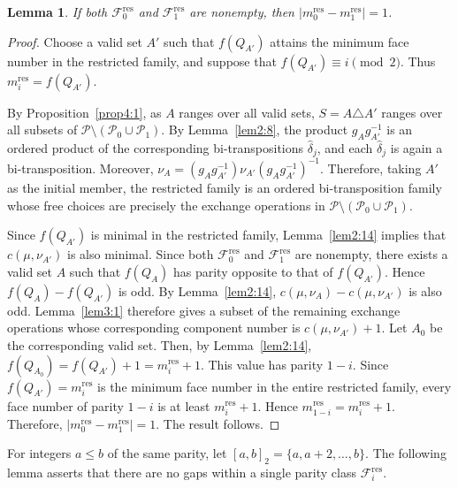 \documentclass[10pt,a4paper]{amsart}
\newtheorem{lemma}[theorem]{Lemma}
\newcommand{\intervaltwo}[2]{[#1,#2]_2}
\begin{document}
\begin{lemma}
\label{lem4:1}
If both $\mathcal F_0^{\mathrm{res}}$ and
$\mathcal F_1^{\mathrm{res}}$ are nonempty, then
$\bigl|m_0^{\mathrm{res}}-m_1^{\mathrm{res}}\bigr|=1$.
\end{lemma}
 \begin{proof}
Choose a valid set $A'$ such that $f(Q_{A'})$ attains the minimum
face number in the restricted family, and suppose that
$f(Q_{A'})\equiv i\pmod 2$. Thus
$m_i^{\mathrm{res}}=f(Q_{A'})$.


By Proposition~\ref{prop4:1}, as $A$ ranges over all valid sets,
$S=A\triangle A'$ ranges over all subsets of
$\mathcal P\setminus(\mathcal P_0\cup\mathcal P_1)$.
By Lemma~\ref{lem2:8}, the product
$g_Ag_{A'}^{-1}$ is an ordered product of the corresponding
bi-transpositions $\widehat\delta_j$, and each
$\widehat\delta_j$ is again a bi-transposition. Moreover,
$\nu_A=(g_Ag_{A'}^{-1})\nu_{A'}(g_Ag_{A'}^{-1})^{-1}$.
Therefore, taking $A'$ as the initial member,
the restricted family is an ordered bi-transposition family
whose free choices are precisely the
exchange operations in
$\mathcal P\setminus(\mathcal P_0\cup\mathcal P_1)$.

Since $f(Q_{A'})$ is minimal in the restricted family,
Lemma~\ref{lem2:14} implies that
$c(\mu,\nu_{A'})$ is also minimal. Since both
$\mathcal F_0^{\mathrm{res}}$ and
$\mathcal F_1^{\mathrm{res}}$ are nonempty, there exists a valid set
$A$ such that $f(Q_A)$ has parity opposite to that of $f(Q_{A'})$.
Hence $f(Q_A)-f(Q_{A'})$ is odd. By Lemma~\ref{lem2:14},
$c(\mu,\nu_A)-c(\mu,\nu_{A'})$ is also odd.
Lemma~\ref{lem3:1} therefore gives a subset of the remaining exchange
operations whose corresponding component number is
$c(\mu,\nu_{A'})+1$. Let $A_0$ be the corresponding valid set.
Then, by Lemma~\ref{lem2:14},
$f(Q_{A_0})=f(Q_{A'})+1=m_i^{\mathrm{res}}+1$.
This value has parity $1-i$.
Since
$f(Q_{A'})=m_i^{\mathrm{res}}$
is the minimum face number in the entire restricted family, every face
number of parity $1-i$ is at least
$m_i^{\mathrm{res}}+1$.
 Hence
$m_{1-i}^{\mathrm{res}}=m_i^{\mathrm{res}}+1$.
Therefore,
$\bigl|m_0^{\mathrm{res}}-m_1^{\mathrm{res}}\bigr|=1$. The result follows.
\end{proof}



For integers $a\le b$ of the same parity, let $\intervaltwo{a}{b}=\{a,a+2,\ldots,b\}.$
The following lemma asserts that there are no gaps within a single parity class $\mathcal F_i^{\mathrm{res}}$.
\end{document}
